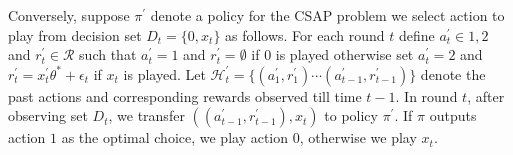 \documentclass{article}
\begin{document}
Conversely,   suppose $\pi^\prime$ denote a policy for the CSAP problem we select action to play from decision set $D_t=\{0,x_t\}$ as follows.  For each round $t$ define $a^\prime_t \in {1,2}$ and $r^\prime_t \in \mathcal{R}$ such that $a^\prime_t=1$ and $r^\prime_t=\emptyset$ if $0$ is played otherwise set $a^\prime_t=2$ and $r^\prime_t=x_t^\prime\theta^* +\epsilon_t$ if $x_t$ is played.  Let $\mathcal{H}^\prime_{t}=\{(a^\prime_1, r^\prime_1)\cdots (a^\prime_{t-1},r^\prime_{t-1})\}$ denote the past actions and corresponding rewards observed till time $t-1$. In round $t$, after observing set  $D_t$, we transfer  $((a^\prime_{t-1},r^\prime_{t-1}), x_t)$ to policy $\pi^\prime$. If $\pi$ outputs action $1$ as the optimal choice, we play action $0$, otherwise we play $x_t$. 

\end{document}
